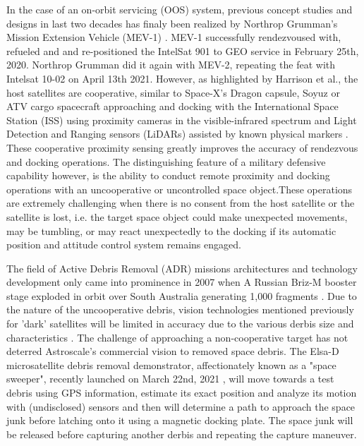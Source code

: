 In the case of an on-orbit servicing (OOS) system, previous concept studies and designs in last two decades \cite{tatschOss06,floresabadReviewSpaceRobotics20141} has finaly been realized by Northrop Grumman's Mission Extension Vehicle (MEV-1) \cite{mev121}. MEV-1 successfully rendezvoused with, refueled and and re-positioned the IntelSat 901 to GEO service in February 25th, 2020.  Northrop Grumman did it again with MEV-2, repeating the feat with Intelsat 10-02 on April 13th 2021\footnotemark[8]{}.
However, as highlighted by Harrison et al.\cite{darkArts21}, the host satellites are cooperative, similar to Space-X's Dragon capsule, Soyuz or ATV cargo spacecraft approaching and docking with the International Space Station (ISS) using proximity cameras in the visible-infrared spectrum and Light Detection and Ranging sensors (LiDARs) assisted by known physical markers \cite{OpromollaPose17}. These cooperative proximity sensing greatly improves the accuracy of rendezvous and docking operations. The distinguishing feature of a military defensive capability however, is the ability to conduct remote proximity and docking operations with an uncooperative or uncontrolled space object.These operations are extremely challenging when there is no consent from the host satellite or the satellite is lost, i.e. the target space object could make unexpected movements, may be tumbling, or may react unexpectedly to the docking if its automatic position and attitude control system remains engaged. 

The field of Active Debris Removal (ADR) missions architectures and technology development only came into prominence in 2007 when A Russian Briz-M booster stage exploded in orbit over South Australia generating 1,000 fragments \cite{bonnalAdr13}. Due to the nature of the uncooperative debris, vision technologies mentioned previously for 'dark' satellites will be limited in accuracy due to the various derbis size and characteristics \cite{limAdrVision13}.  The challenge of approaching a non-cooperative target has not deterred Astroscale's commercial vision to removed space debris. The Elsa-D microsatellite debris removal demonstrator, affectionately known as a "space sweeper", recently launched on March 22nd, 2021 \footnotemark{}, will move towards a test debris using GPS information, estimate its exact position and analyze its motion with (undisclosed) sensors and then will determine a path to approach the space junk before latching onto it using a magnetic docking plate. The space junk will be released before capturing another derbis and repeating the capture maneuver\cite{elsaD19}.

